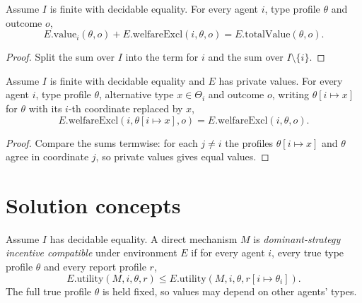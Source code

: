 \begin{lemma}\label{thm:MathEconLib.Mechanism.QuasilinearEnvironment.value_add_welfareExcl}\leanok
{}
Assume $I$ is finite with decidable equality. For every agent $i$, type profile $\theta$ and outcome $o$,
\[
E.\mathrm{value}_i(\theta,o)+E.\mathrm{welfareExcl}(i,\theta,o)=E.\mathrm{totalValue}(\theta,o).
\]
\end{lemma}
\begin{proof}\leanok
{}
Split the sum over $I$ into the term for $i$ and the sum over $I\setminus\{i\}$.
\end{proof}

\begin{lemma}\label{thm:MathEconLib.Mechanism.QuasilinearEnvironment.welfareExcl_update}\leanok
{}
Assume $I$ is finite with decidable equality and $E$ has private values. For every agent $i$, type profile $\theta$, alternative type $x\in\Theta_i$ and outcome $o$, writing $\theta[i\mapsto x]$ for $\theta$ with its $i$-th coordinate replaced by $x$,
\[
E.\mathrm{welfareExcl}(i,\theta[i\mapsto x],o)=E.\mathrm{welfareExcl}(i,\theta,o).
\]
\end{lemma}
\begin{proof}\leanok
{}
Compare the sums termwise: for each $j\neq i$ the profiles $\theta[i\mapsto x]$ and $\theta$ agree in coordinate $j$, so private values gives equal values.
\end{proof}

\section{Solution concepts}

\begin{definition}\label{def:MathEconLib.Mechanism.DirectMechanism.IsDSIC}\leanok
{}
Assume $I$ has decidable equality. A direct mechanism $M$ is \emph{dominant-strategy incentive compatible} under environment $E$ if for every agent $i$, every true type profile $\theta$ and every report profile $r$,
\[
E.\mathrm{utility}(M,i,\theta,r)\le E.\mathrm{utility}(M,i,\theta,r[i\mapsto\theta_i]).
\]
The full true profile $\theta$ is held fixed, so values may depend on other agents' types.
\end{definition}

